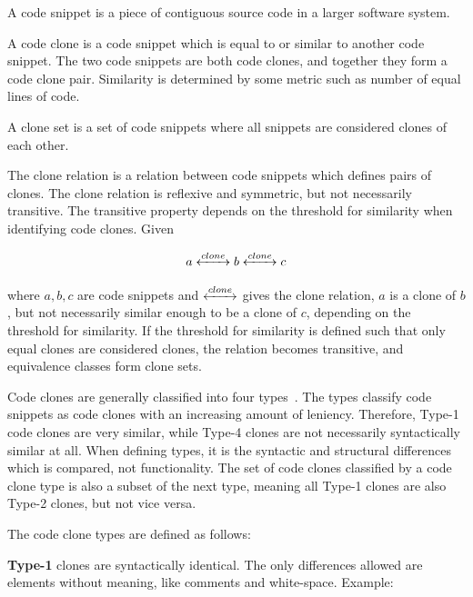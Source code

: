 \begin{definition}
	A code snippet is a piece of contiguous source code in a larger software system.
\end{definition}

\begin{definition}
	A code clone is a code snippet which is equal to or similar to another code snippet. The two
	code snippets are both code clones, and together they form a code clone pair.
	Similarity is determined by some metric such as number of equal lines of code.
\end{definition}

\begin{definition}
	A clone set is a set of code snippets where all snippets are considered clones of each
	other.
\end{definition}


The clone relation is a relation between code snippets which defines pairs of clones.
The clone relation is reflexive and symmetric, but not necessarily transitive. The transitive
property depends on the threshold for similarity when identifying code clones. Given

$$a \xleftrightarrow{clone} b \xleftrightarrow{clone} c$$


where $a,b,c$ are code snippets and $\xleftrightarrow{clone}$ gives the clone relation,
$a$ is a clone of $b$, but not necessarily similar enough to be a clone of $c$, depending
on the threshold for similarity. If the threshold for similarity is defined such that only
equal clones are considered clones, the relation becomes transitive, and equivalence
classes form clone sets.

Code clones are generally classified into four types~\cite{Inoue_introduction_to_cc}. The
types classify code snippets as code clones with an increasing amount of leniency.
Therefore, Type-1 code clones are very similar, while Type-4 clones are not necessarily
syntactically similar at all. When defining types, it is the syntactic and structural
differences which is compared, not functionality. The set of code clones classified by a
code clone type is also a subset of the next type, meaning all Type-1 clones are also
Type-2 clones, but not vice versa.

The code clone types are defined as follows:

\textbf{Type-1} clones are syntactically identical. The only differences allowed are elements
without meaning, like comments and white-space. Example:

